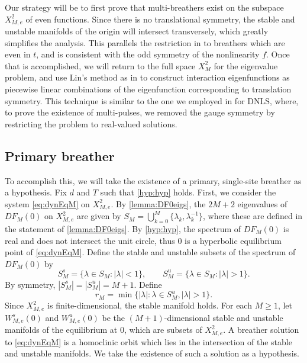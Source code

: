 \documentclass[12pt,reqno]{amsart}
\theoremstyle{definition}
\begin{document}
Our strategy will be to first prove that multi-breathers exist on the subspace $X_{M,e}^2$ of even functions. Since there is no translational symmetry, the stable and unstable manifolds of the origin will intersect transversely, which greatly simplifies the analysis. This parallels the restriction in \cite{Pelinovsky2012} to breathers which are even in $t$, and is consistent with the odd symmetry of the nonlinearity $f$. 
Once that is accomplished, we will return to the full space $X_{M}^2$ for the eigenvalue problem, and use Lin's method as in \cites{Parker2021,Parker2020,Sandstede1998} to construct interaction eigenfunctions as piecewise linear combinations of the eigenfunction corresponding to translation symmetry. This technique is similar to the one we employed in \cite{Parker2020} for DNLS, where, to prove the existence of multi-pulses, we removed the gauge symmetry by restricting the problem to real-valued solutions.

\subsection{Primary breather}

To accomplish this, we will take the existence of a primary, single-site breather as a hypothesis. 
Fix $d$ and $T$ such that \cref{hyp:hyp} holds. First, we consider the system \cref{eq:dynEqM} on $X_{M,e}^2$. By \cref{lemma:DF0eigs}, the $2M+2$ eigenvalues of $DF_M(0)$ on $X_{M,e}^2$ are given by $S_M = \bigcup_{k=0}^M \{\lambda_k, \lambda_k^{-1} \}$, where these are defined in the statement of \cref{lemma:DF0eigs}. By \cref{hyp:hyp}, the spectrum of $DF_M(0)$ is real and does not intersect the unit circle, thus 0 is a hyperbolic equilibrium point of \cref{eq:dynEqM}. Define the stable and unstable subsets of the spectrum of $DF_M(0)$ by
\[
S_M^s = \{ \lambda \in S_M : |\lambda| < 1\}, \qquad S_M^u = \{ \lambda \in S_M : |\lambda| > 1\}.
\]
By symmetry, $|S_M^s| = |S_M^u| = M+1$. Define
\begin{equation}\label{eq:defrM}
r_M = \min \{ |\lambda| : \lambda \in S_M^u, |\lambda| > 1 \}.
\end{equation}
Since $X_{M,e}^2$ is finite-dimensional, the stable manifold holds. For each $M \geq 1$, let $W_{M,e}^s(0)$ and $W_{M,e}^u(0)$ be the $(M+1)$-dimensional stable and unstable manifolds of the equilibrium at 0, which are subsets of $X_{M,e}^2$. A breather solution to \cref{eq:dynEqM} is a homoclinic orbit which lies in the intersection of the stable and unstable manifolds. We take the existence of such a solution as a hypothesis.
\end{document}
